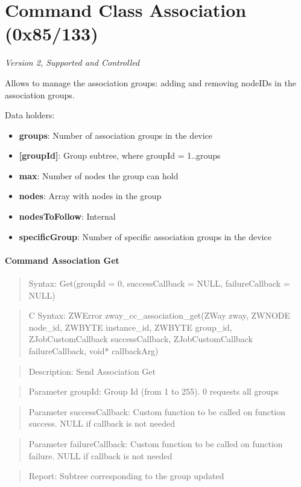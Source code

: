 \section{Command Class Association (0x85/133)}

\textit{Version 2, Supported and Controlled}
\newline

Allows to manage the association groups: adding and removing nodeIDs in the association groups.
\newline

\noindent
Data holders:

\begin{itemize}
\item \textbf{groups}: Number of association groups in the device
\item \textbf{[groupId]}: Group subtree, where groupId = 1..groups
\item \qquad\textbf{max}: Number of nodes the group can hold
\item \qquad\textbf{nodes}: Array with nodes in the group
\item \qquad\textbf{nodesToFollow}: Internal
\item \textbf{specificGroup}: Number of specific association groups in the device
\end{itemize}

\paragraph{Command Association Get}
\begin{quote}Syntax: Get(groupId = 0, successCallback = NULL, failureCallback = NULL)\end{quote}
\begin{quote}C Syntax: ZWError zway\_cc\_association\_get(ZWay zway, ZWNODE node\_id, ZWBYTE instance\_id, ZWBYTE group\_id, ZJobCustomCallback successCallback, ZJobCustomCallback failureCallback, void* callbackArg)\end{quote}
\begin{quote}Description: Send Association Get\end{quote}
\begin{quote}Parameter groupId: Group Id (from 1 to 255). 0 requests all groups\end{quote}
\begin{quote}Parameter successCallback: Custom function to be called on function success. NULL if callback is not needed\end{quote}
\begin{quote}Parameter failureCallback: Custom function to be called on function failure. NULL if callback is not needed\end{quote}
\begin{quote}Report: Subtree corresponding to the group updated\end{quote}

